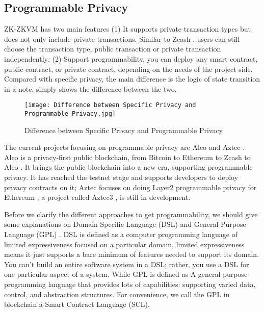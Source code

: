 \subsection{Programmable Privacy}

ZK-ZKVM has two main features (1) It supports private transaction types but does not only include private transactions. Similar to Zcash \cite{website:Zcash}, users can still 
choose the transaction type, public transaction or private transaction independently; 
(2) Support programmability, you can deploy any smart contract, public contract, or 
private contract, depending on the needs of the project side. Compared with specific 
privacy, the main difference is the logic of state transition in a note,  simply shows the difference 
between the two.
\begin{figure}[!ht]
    \centering
    \texttt{[image: Difference between Specific Privacy and Programmable Privacy.jpg]}
    \caption{Difference between Specific Privacy and Programmable Privacy}
    \label{fig:Difference between Specific Privacy and Programmable Privacy}
\end{figure}

The current projects focusing on programmable privacy are Aleo \cite{website:Aleo} and Aztec \cite{website:Aztec}. Aleo \cite{website:Aleo} is a 
privacy-first public blockchain, from Bitcoin \cite{website:BTC} to Ethereum \cite{website:Ethereum} to Zcash \cite{website:Zcash} to Aleo \cite{website:Aleo}. It brings the public blockchain into a new era,
supporting programmable privacy. 
It has reached the testnet stage and supports developers to deploy privacy contracts on it; 
Aztec \cite{website:Aztec} focuses on doing Layer2 programmable privacy for Ethereum \cite{website:Ethereum}, a project 
called Aztec3 \cite{website:Aztec3}, is still in development.

Before we clarify the different approaches to get programmability, we should give some explanations on Domain Specific Language (DSL) \cite{website:DSL} and General Purpose Language (GPL) \cite{website:DSL}.
DSL \cite{website:DSL} is defined as a computer programming language of limited expressiveness focused on a particular domain, limited expressiveness means it just supports a bare minimum of features 
needed to support its domain. You can't build an entire software system in a DSL; rather, you use a DSL \cite{website:DSL} for one particular aspect of a system. While GPL \cite{website:DSL} is defined as A general-purpose programming language
that provides lots of capabilities: supporting varied data, control, and abstraction structures. For convenience, we call the GPL in blockchain a Smart Contract Language (SCL).

